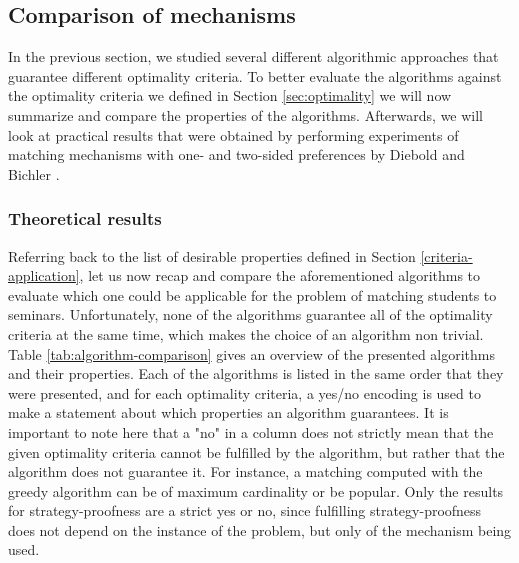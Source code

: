 \subsection{Comparison of mechanisms}
In the previous section, we studied several different algorithmic approaches that guarantee different optimality criteria. To better evaluate the algorithms against the optimality criteria we defined in Section \ref{sec:optimality} we will now summarize and compare the properties of the algorithms. Afterwards, we will look at practical results that were obtained by performing experiments of matching mechanisms with one- and two-sided preferences by Diebold and Bichler \cite{DieboldBenchmark}.

\subsubsection{Theoretical results}
Referring back to the list of desirable properties defined in Section \ref{criteria-application}, let us now recap and compare the aforementioned algorithms to evaluate which one could be applicable for the problem of matching students to seminars. Unfortunately, none of the algorithms guarantee all of the optimality criteria at the same time, which makes the choice of an algorithm non trivial. Table \ref{tab:algorithm-comparison} gives an overview of the presented algorithms and their properties. Each of the algorithms is listed in the same order that they were presented, and for each optimality criteria, a yes/no encoding is used to make a statement about which properties an algorithm guarantees. It is important to note here that a "no" in a column does not strictly mean that the given optimality criteria cannot be fulfilled by the algorithm, but rather that the algorithm does not guarantee it. For instance, a matching computed with the greedy algorithm can be of maximum cardinality or be popular. Only the results for strategy-proofness are a strict yes or no, since fulfilling strategy-proofness does not depend on the instance of the problem, but only of the mechanism being used. 

